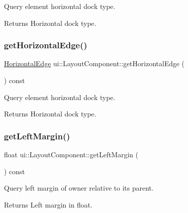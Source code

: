 Query element horizontal dock type. \begin{DoxyReturn}{Returns}
Horizontal dock type. 
\end{DoxyReturn}
\mbox{\label{classui_1_1LayoutComponent_af23f1c68ba944cea8baf0b89acb642a9}} 
\subsubsection{\texorpdfstring{get\+Horizontal\+Edge()}{getHorizontalEdge()}\hspace{0.1cm}{\footnotesize\ttfamily [2/2]}}
{\footnotesize\ttfamily \hyperlink{classui_1_1LayoutComponent_aaa61687a8a4e98f525413e1f0cfacf18}{Horizontal\+Edge} ui\+::\+Layout\+Component\+::get\+Horizontal\+Edge (\begin{DoxyParamCaption}{ }\end{DoxyParamCaption}) const}

Query element horizontal dock type. \begin{DoxyReturn}{Returns}
Horizontal dock type. 
\end{DoxyReturn}
\mbox{\label{classui_1_1LayoutComponent_a1d6daf298cc0dc49334d6ecf66ee6fe7}} 
\subsubsection{\texorpdfstring{get\+Left\+Margin()}{getLeftMargin()}\hspace{0.1cm}{\footnotesize\ttfamily [1/2]}}
{\footnotesize\ttfamily float ui\+::\+Layout\+Component\+::get\+Left\+Margin (\begin{DoxyParamCaption}{ }\end{DoxyParamCaption}) const}

Query left margin of owner relative to its parent. \begin{DoxyReturn}{Returns}
Left margin in float. 
\end{DoxyReturn}
\mbox{\label{classui_1_1LayoutComponent_a1d6daf298cc0dc49334d6ecf66ee6fe7}} 
